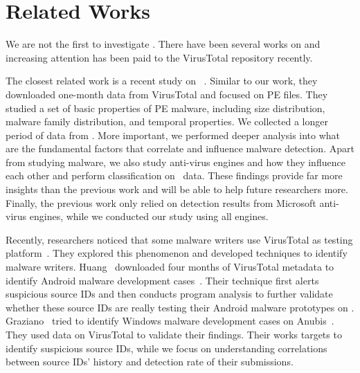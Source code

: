\section{Related Works}
\label{sec:related}


We are not the first to investigate \vt.
There have been several works on \vt
and increasing attention has been paid to the VirusTotal repository recently.

The closest related work is a recent study on \vt{}~\cite{SongAPsys2016}. 
Similar to our work, they downloaded one-month data from VirusTotal
and focused on PE files.
They studied a set of basic properties of PE malware,
including size distribution, malware family distribution, and temporal properties.   
We collected a longer period of data from \vt.
More important, we performed deeper analysis into what are the fundamental factors 
that correlate and influence malware detection.
Apart from studying malware, we also study anti-virus engines and how they influence each other
and perform classification on \vt\ data.
These findings provide far more insights than the previous work and will be able to help future researchers more.
Finally, the previous work only relied on detection results from Microsoft anti-virus engines,
while we conducted our study using all engines.

Recently, researchers noticed that some malware writers use VirusTotal as testing platform~\cite{huangvt2016bigdata, neeles}.
They explored this phenomenon and developed techniques to identify malware writers. 
Huang \etal\ downloaded four months of VirusTotal metadata to identify Android malware development cases~\cite{huangvt2016bigdata}. 
Their technique first alerts suspicious source IDs 
and then conducts program analysis to further validate whether 
these source IDs are really testing their Android malware prototypes on \vt{}. 
Graziano \etal\ tried to identify Windows malware development cases on Anubis~\cite{neeles}. 
They used data on VirusTotal to validate their findings. 
Their works targets to identify suspicious source IDs, 
while we focus on understanding correlations between source IDs' history and detection rate of their submissions.



